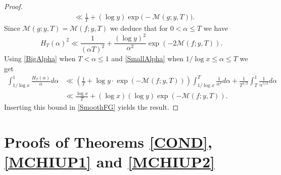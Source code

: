 \documentclass[12pt]{amsart}
\theoremstyle{definition}
\numberwithin{equation}{section}
\begin{document}
\begin{proof}
\begin{align*}
&\ll \frac{1}{T}+ (\log y)\exp\big(-\mathcal{M}(g; y, T)\big).
\end{align*}
Since $\mathcal{M}(g; y, T)=\mathcal{M}(f; y, T)$ we deduce that for $0<\alpha\leq T$ we have
\begin{equation}\label{SmallAlpha}
H_{T}(\alpha)^2\ll \frac{1}{(\alpha T)^2}+\frac{(\log y)^2}{\alpha^2}\exp\left(-2\mathcal{M}(f; y, T)\right).
\end{equation}
Using \eqref{BigAlpha} when $T<\alpha\leq 1$ and \eqref{SmallAlpha} when $1/\log x\leq \alpha\leq T$ we get
\begin{align*}
\int_{1/\log x}^1 \frac{H_{T}(\alpha)}{\alpha} d\alpha 
&\ll \left(\frac{1}{T}+ \log y \cdot \exp\left(-\mathcal{M}(f; y, T)\right)\right)\int_{1/\log x}^{T} \frac{1}{\alpha^2}d\alpha+  \frac{1}{T^{1/2}}\int_{T}^1\frac{1}{\alpha^{5/2}}d\alpha\\
&\ll \frac{\log x}{T}+ (\log x)(\log y) \exp\left(-\mathcal{M}(f; y, T)\right). 
\end{align*}
Inserting this bound in \eqref{SmoothFG} yields the result.

\end{proof}
\section{Proofs of Theorems \ref{COND}, \ref{MCHIUP1} and \ref{MCHIUP2}}
\end{document}
